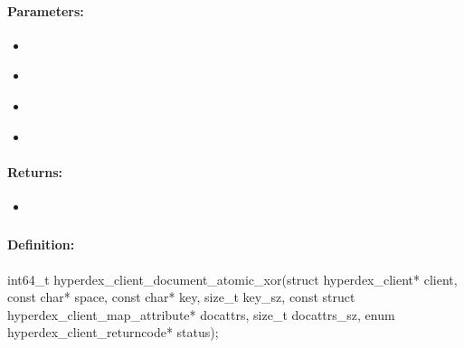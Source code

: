 \paragraph{Parameters:}
\begin{itemize}[noitemsep]
\item {}\\

\item {}\\

\item {}\\

\item {}\\

\end{itemize}

\paragraph{Returns:}
\begin{itemize}[noitemsep]
\item {}\\

\end{itemize}

\pagebreak
\subsubsection{}
\label{api:c:document_atomic_xor}


\paragraph{Definition:}
\begin{ccode}
int64_t hyperdex_client_document_atomic_xor(struct hyperdex_client* client,
        const char* space,
        const char* key, size_t key_sz,
        const struct hyperdex_client_map_attribute* docattrs, size_t docattrs_sz,
        enum hyperdex_client_returncode* status);
\end{ccode}

